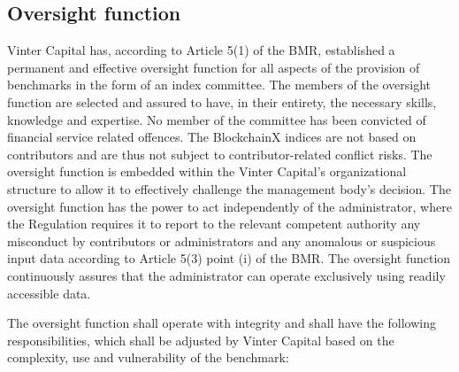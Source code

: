 \documentclass{article}
\begin{document}
\subsection{Oversight function}
Vinter Capital has, according to Article 5(1) of the BMR, established a permanent and effective oversight function for all aspects of the provision of benchmarks in the form of an index committee. The members of the oversight function are selected and assured to have, in their entirety, the necessary skills, knowledge and expertise. No member of the committee has been convicted of financial service related offences. The BlockchainX indices are not based on contributors and are thus not subject to contributor-related conflict risks. The oversight function is embedded within the Vinter Capital’s organizational structure to allow it to effectively challenge the management body’s decision. The oversight function has the power to act independently of the administrator, where the Regulation requires it to report to the relevant competent authority any misconduct by contributors or administrators and any anomalous or suspicious input data according to Article 5(3) point (i) of the BMR. The oversight function continuously assures that the administrator can operate exclusively using readily accessible data.
\newline

The oversight function shall operate with integrity and shall have the following responsibilities, which shall be adjusted by Vinter Capital based on the complexity, use and vulnerability of the benchmark:
\end{document}
